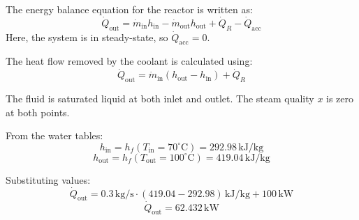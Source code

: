 The energy balance equation for the reactor is written as:  
\[
\dot{Q}_{\text{out}} = \dot{m}_{\text{in}} h_{\text{in}} - \dot{m}_{\text{out}} h_{\text{out}} + \dot{Q}_R - \dot{Q}_{\text{acc}}
\]  
Here, the system is in steady-state, so \(\dot{Q}_{\text{acc}} = 0\).  

The heat flow removed by the coolant is calculated using:  
\[
\dot{Q}_{\text{out}} = \dot{m}_{\text{in}} (h_{\text{out}} - h_{\text{in}}) + \dot{Q}_R
\]  

The fluid is saturated liquid at both inlet and outlet. The steam quality \(x\) is zero at both points.  

From the water tables:  
\[
h_{\text{in}} = h_f(T_{\text{in}} = 70^\circ\text{C}) = 292.98 \, \text{kJ/kg}
\]  
\[
h_{\text{out}} = h_f(T_{\text{out}} = 100^\circ\text{C}) = 419.04 \, \text{kJ/kg}
\]  

Substituting values:  
\[
\dot{Q}_{\text{out}} = 0.3 \, \text{kg/s} \cdot (419.04 - 292.98) \, \text{kJ/kg} + 100 \, \text{kW}
\]  
\[
\dot{Q}_{\text{out}} = 62.432 \, \text{kW}
\]